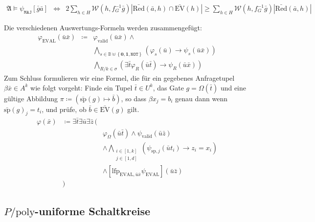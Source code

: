 \begin{eqnarray*}
\mathfrak{A}\models\psi_{\mathtt{MAJ}}\left[\bar{g}\bar{a}\right] & \Leftrightarrow & 2\sum_{h\in H}\mathcal{W}\left(h,f_{G}^{-1}\bar{g}\right)\left|\bar{\mathrm{Red}}\left(\bar{a},h\right)\cap\bar{\mathrm{EV}}\left(h\right)\right|\geqslant\sum_{h\in H}\mathcal{W}\left(h,f_{G}^{-1}\bar{g}\right)\left|\bar{\mathrm{Red}}\left(\bar{a},h\right)\right|
\end{eqnarray*}

Die verschiedenen Auswertungs-Formeln werden zusammengefügt:
\begin{eqnarray*}
\varphi_{\mathrm{EVAL}}\left(\bar{u}\bar{x}\right) & \coloneqq & \varphi_{\mathrm{valid}}\left(\bar{u}\bar{x}\right)\wedge\\
 &  & \bigwedge_{s\in\mathbb{B}\uplus\left\{ \mathbf{0},\mathbf{1},\mathtt{NOT}\right\} }\left(\varphi_{s}\left(\bar{u}\right)\rightarrow\psi_{s}\left(\bar{u}\bar{x}\right)\right)\\
 &  & \bigwedge_{R/k\in\sigma}\left(\exists\bar{t}\varphi_{R}\left(\bar{u}\bar{t}\right)\rightarrow\psi_{R}\left(\bar{u}\bar{x}\right)\right)
\end{eqnarray*}
Zum Schluss formulieren wir eine Formel, die für ein gegebenes Anfragetupel
$\beta\bar{x}\in A^{k}$ wie folgt vorgeht: Finde ein Tupel $\bar{t}\in U^{k}$,
das Gate $g=\Omega\left(\bar{t}\right)$ und eine gültige Abbildung
$\pi\coloneqq\left(\bar{\mathrm{sp}}\left(g\right)\mapsto\bar{b}\right)$,
so dass $\beta x_{j}=b_{i}$ genau dann wenn $\bar{\mathrm{sp}}\left(g\right)_{j}=t_{i}$,
und prüfe, ob $\bar{b}\in\bar{\mathrm{EV}}\left(g\right)$ gilt. 
\begin{eqnarray*}
\varphi\left(\bar{x}\right) & \coloneqq\exists\bar{t}\exists\bar{u}\exists\bar{z}\,(\\
 &  & \varphi_{\Omega}\left(\bar{u}\bar{t}\right)\wedge\psi_{\mathrm{valid}}\left(\bar{u}\bar{z}\right)\\
 &  & \wedge\bigwedge_{\substack{i\in\left[1,k\right]\\
j\in\left[1,d\right]
}
}\left(\psi_{\mathrm{sp},j}\left(\bar{u}t_{i}\right)\rightarrow z_{i}=x_{i}\right)\\
 &  & \wedge\left[\mathrm{lfp}_{\mathrm{EVAL},\bar{u}\bar{x}}\psi_{\mathrm{EVAL}}\right]\left(\bar{u}\bar{z}\right)\\
 & )
\end{eqnarray*}


\subsection{\label{subsec:p-poly-sbc}$P/\mathrm{poly}$-uniforme Schaltkreise}

